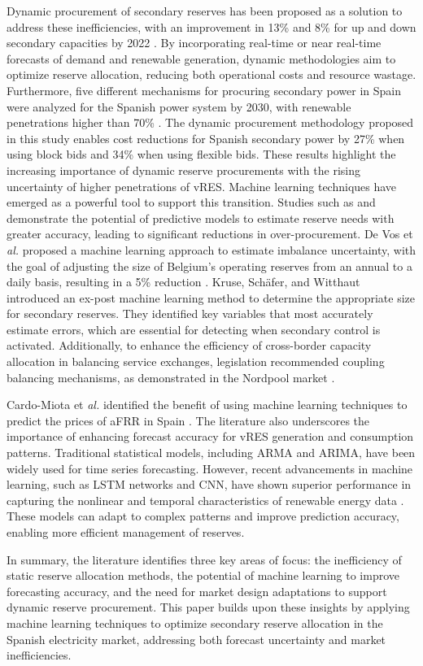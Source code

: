 Dynamic procurement of secondary reserves has been proposed as a solution to address these inefficiencies, with an improvement in 13\% and 8\% for up and down secondary capacities by 2022 \cite{Algarvio2024}. By incorporating real-time or near real-time forecasts of demand and renewable generation, dynamic methodologies aim to optimize reserve allocation, reducing both operational costs and resource wastage.
%
Furthermore, five different mechanisms for procuring secondary power in Spain were analyzed for the Spanish power system by 2030, with renewable penetrations higher than 70\% \cite{Algarvio:24}. The dynamic procurement methodology proposed in this study enables cost reductions for Spanish secondary power by 27\% when using block bids and 34\% when using flexible bids. These results highlight the increasing importance of dynamic reserve procurements with the rising uncertainty of higher penetrations of \gls{vRES}.  
%
Machine learning techniques have emerged as a powerful tool to support this transition. Studies such as \cite{DeVos2019} and \cite{Kruse2022} demonstrate the potential of predictive models to estimate reserve needs with greater accuracy, leading to significant reductions in over-procurement. 
De Vos et \textit{al.} proposed a machine learning approach to estimate imbalance uncertainty, with the goal of adjusting the size of Belgium's operating reserves from an annual to a daily basis, resulting in a 5\% reduction \cite{DeVos2019}. Kruse, Sch\"{a}fer, and Witthaut introduced an ex-post machine learning method to determine the appropriate size for secondary reserves. They identified key variables that most accurately estimate errors, which are essential for detecting when secondary control is activated. Additionally, to enhance the efficiency of cross-border capacity allocation in balancing service exchanges, legislation recommended coupling balancing mechanisms, as demonstrated in the Nordpool market \cite{Frade:19c,Khodadadi:20}.\par
Cardo-Miota et \textit{al.} identified the benefit of using machine learning techniques to predict the prices of \gls{aFRR} in Spain \cite{Cardo-Miota:23}.
The literature also underscores the importance of enhancing forecast accuracy for \gls{vRES} generation and consumption patterns. Traditional statistical models, including ARMA and ARIMA, have been widely used for time series forecasting. However, recent advancements in machine learning, such as \gls{LSTM} networks and \gls{CNN}, have shown superior performance in capturing the nonlinear and temporal characteristics of renewable energy data \cite{Couto:21,Benti2023}. These models can adapt to complex patterns and improve prediction accuracy, enabling more efficient management of reserves.\par
In summary, the literature identifies three key areas of focus: the inefficiency of static reserve allocation methods, the potential of machine learning to improve forecasting accuracy, and the need for market design adaptations to support dynamic reserve procurement. This paper builds upon these insights by applying machine learning techniques to optimize secondary reserve allocation in the Spanish electricity market, addressing both forecast uncertainty and market inefficiencies.\par